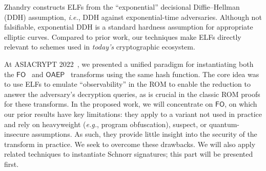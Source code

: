 \noindent Zhandry constructs ELFs from the ``exponential'' decisional Diffie–Hellman (DDH) assumption, \emph{i.e.}, DDH against exponential-time adversaries. Although not falsifiable, exponential DDH is a standard hardness assumption for appropriate elliptic curves.
Compared to prior work, our techniques make ELFs directly relevant to schemes used in \emph{today's} cryptographic ecosystem. 

At ASIACRYPT 2022~\cite{AC:MurONeZah22}, we presented a unified paradigm for instantiating both the $\mathsf{FO}$~\cite{JC:FujOka13} and $\mathsf{OAEP}$~\cite{EC:BelRog94} transforms using the same hash function. The core idea was to use ELFs to emulate ``observability'' in the ROM to enable the reduction to answer the adversary's decryption queries, as is crucial in the classic ROM proofs for these transforms. In the proposed work, we will concentrate on $\mathsf{FO}$, on which our prior results have key limitations: they apply to a variant not used in practice and rely on heavyweight (\emph{e.g.}, program obfuscation), suspect, or quantum-insecure assumptions. As such, they provide little insight into the security of the transform in practice. We seek to overcome these drawbacks. We will also apply related techniques to instantiate Schnorr signatures; this part will be presented first.

